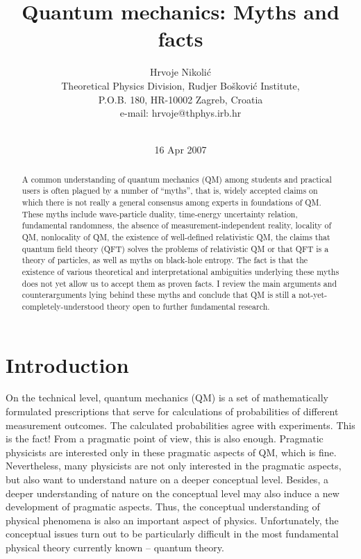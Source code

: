 \documentclass[12pt]{article}
\title{Quantum mechanics: Myths and facts}
\author{Hrvoje Nikoli\'c \\
Theoretical Physics Division, Rudjer Bo\v{s}kovi\'{c} Institute, \\
P.O.B. 180, HR-10002 Zagreb, Croatia \\
{\normalsize e-mail: hrvoje@thphys.irb.hr} \\
\makebox[1in]{} \\
}
\date{16 Apr 2007}
\begin{document}
\maketitle
\begin{abstract}
A common understanding of quantum mechanics (QM) among students and 
practical users is often plagued by a number of ``myths'', that is,  
widely accepted claims on which there is not really a general consensus
among experts in foundations of QM. These myths include 
wave-particle duality, time-energy uncertainty relation, 
fundamental randomness, the absence of measurement-independent reality, 
locality of QM, nonlocality of QM, 
the existence of well-defined relativistic QM, the claims that 
quantum field theory (QFT) solves the problems of relativistic QM or
that QFT is a theory of particles, as well as myths on black-hole entropy.  
The fact is that the existence of various theoretical and interpretational 
ambiguities underlying these myths does not yet allow us to accept
them as proven facts. I review the main arguments and counterarguments 
lying behind these myths and conclude that QM is still a 
not-yet-completely-understood theory open to further fundamental 
research. 
\end{abstract}




\newpage

\tableofcontents

\newpage

\section{Introduction}

On the technical level, quantum mechanics (QM) is a set of mathematically 
formulated prescriptions that serve for calculations of probabilities 
of different measurement outcomes. The calculated probabilities
agree with experiments. This is the fact! 
From a pragmatic point of view, this is also enough.
Pragmatic physicists are interested only in 
these pragmatic aspects of QM, which is fine. Nevertheless, many 
physicists are not only interested in the pragmatic aspects, 
but also want to understand nature on a deeper conceptual level. Besides, 
a deeper understanding of nature on the conceptual level may also induce 
a new development of pragmatic aspects. Thus, the conceptual
understanding of physical phenomena is also an important aspect of physics.
Unfortunately, the conceptual issues turn out to be particularly difficult in 
the most fundamental physical theory currently known -- quantum theory.
     
\end{document}

